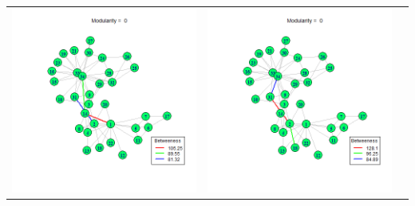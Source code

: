 \documentclass[letterpaper,11pt]{report}
\begin{document}
\begin{savenotes}
\begin{table}[htbp]
\begin{tabular}{ccc}
			\includegraphics[scale=0.25]{karateClub-community-0005.png} & 
			\includegraphics[scale=0.25]{karateClub-community-0006.png} \\

\end{tabular}
\end{table}
\end{savenotes}
\end{document}

